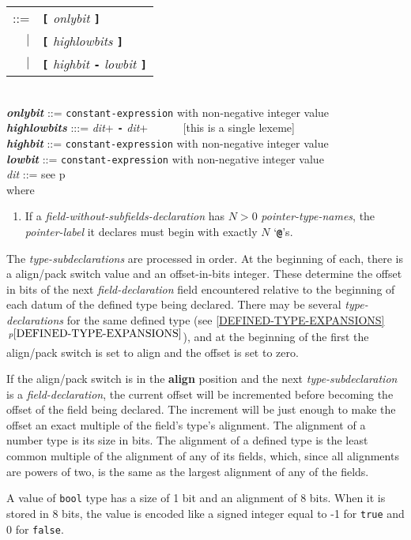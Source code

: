 \documentclass[12pt]{article}
\newcommand{\TT}[1]{{\tt \bfseries #1}}
\newcommand{\key}[1]{{\rm \bfseries #1}}
\newcommand{\emkey}[1]{{\em \bfseries #1}}
\newcommand{\itemref}[1]{\ref{#1}$\,^{p\pageref{#1}}$}
\newcommand{\pagref}[1]{p\pageref{#1}}
\newenvironment{indpar}[1][0.3in]%
	{\begin{list}{}%
		     {\setlength{\itemsep}{0in}%
		      \setlength{\topsep}{0in}%
		      \setlength{\parsep}{1ex}%
		      \setlength{\labelwidth}{#1}%
		      \setlength{\leftmargin}{#1}%
		      \addtolength{\leftmargin}{\labelsep}}%
	 \item}%
	{\end{list}}
\begin{document}
\begin{indpar}
\begin{tabular}[t]{@{}rl}
    ::= &  \TT{[} {\em onlybit} \TT{]} \\
    $|$ &  \TT{[} {\em highlowbits} \TT{]} \\
    $|$ &  \TT{[} {\em highbit} \TT{-} {\em lowbit} \TT{]}
    \end{tabular} \\
\emkey{onlybit} ::= {\tt constant-expression}
		    with non-negative integer value \\
\emkey{highlowbits} :::= {\em dit}+ \TT{-} {\em dit}+
           ~~~~~ [this is a single lexeme] \\
\emkey{highbit} ::= {\tt constant-expression}
		    with non-negative integer value \\
\emkey{lowbit} ::= {\tt constant-expression}
		   with non-negative integer value \\
{\em dit} ::= see \pagref{DIT}
\\[2ex]
where
\begin{enumerate}
\item If a {\em field-without-subfields-declaration}
has $N>0$ {\em pointer-type-names}, the {\em pointer-label}
it declares must begin with exactly $N$ `\TT{@}'s.
\end{enumerate}
\end{indpar}

The {\em type-subdeclarations} are processed in order.  At the
beginning of each, there is a align/pack switch value and an
offset-in-bits integer.  These determine the offset in bits
of the next {\em field-declaration} field encountered
relative to the beginning of each datum of the defined
type being declared.  There may be several {\em type-declarations}
for the same defined type (see \itemref{DEFINED-TYPE-EXPANSIONS}),
and at the beginning
of the first the align/pack switch is set to align and the offset
is set to zero.

If the align/pack switch is in the \key{align} position and the
next {\em type-subdeclaration} is a {\em field-declaration}, the
current offset will be incremented before becoming the offset
of the field being declared.  The increment will be just enough
to make the offset an exact multiple of the field's type's alignment.
The alignment of a number type is its size in bits.  The alignment
of a defined type is the least common multiple of the alignment of
any of its fields, which, since all alignments are powers of two,
is the same as the largest alignment of any of the fields.

A value of {\tt bool} type has a size of 1 bit and an alignment
of 8 bits.  When it is stored in 8 bits, the value is encoded
like a signed integer equal to -1 for {\tt true} and 0 for {\tt false}.
\end{document}
